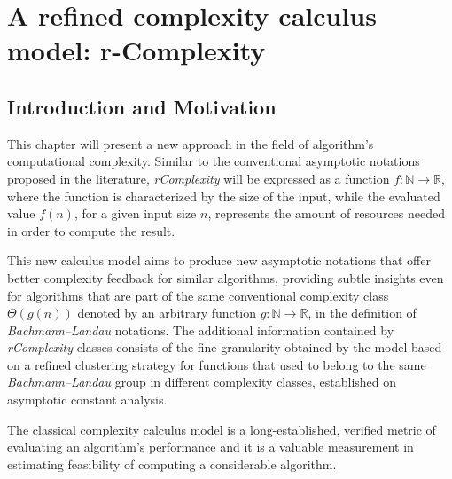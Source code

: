 \chapter{A refined complexity calculus model: r-Complexity }


\section{Introduction and Motivation}
This chapter will present a new approach in the field of algorithm's computational complexity. Similar to the conventional asymptotic notations proposed in the literature,  \textit{rComplexity} will be expressed as a function $f:\mathbb{N}\longrightarrow\mathbb{R}$, where the function is characterized by the size of the input, while the evaluated value $f(n)$, for a given input size $n$, represents the amount of resources needed in order to compute the result.

This new calculus model aims to produce new asymptotic notations that offer better complexity feedback for similar algorithms, providing subtle insights even for algorithms that are part of the same conventional complexity class $\Theta(g(n))$ denoted by an arbitrary function $g:\mathbb{N}\longrightarrow\mathbb{R}$, in the definition of \textit{Bachmann–Landau} notations. The additional information contained by \textit{rComplexity} classes consists of the fine-granularity obtained by the model based on a refined clustering strategy for functions that used to belong to the same \textit{Bachmann–Landau} group in different complexity classes, established on asymptotic constant analysis.

The classical complexity calculus model is a long-established, verified metric of evaluating an algorithm's performance and it is a valuable measurement in estimating feasibility of computing a considerable algorithm.

